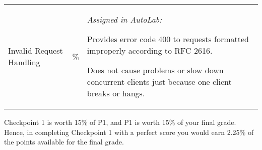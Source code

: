 \begin{center}
\begin{tabular}{>{\centering\arraybackslash}m{1in}>{\centering\arraybackslash}m{1in}p{3in}}
  \hline
  \addlinespace[5pt]

  Invalid Request Handling&45\%&\vspace{-10pt} 
                              {\it Assigned in AutoLab:}
                              \begin{packed_itemize}
                                  \item Provides error code 400 to requests formatted improperly according to RFC 2616.

                                \item Does not cause problems or slow down concurrent clients just because one client breaks or hangs.
                              \end{packed_itemize}\\

\end{tabular}
\end{center}


\noindent Checkpoint 1 is worth 15\% of P1, and P1 is worth 15\% of your final grade. Hence, in completing Checkpoint 1 with a perfect score you would earn 2.25\% of the points available for the final grade.


